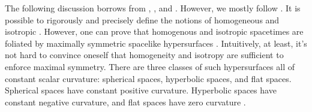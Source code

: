 \documentclass[]{article}
\begin{document}
% 

The following discussion borrows from \cite{Carroll},
\cite{MisnerThorneWheeler}, and \cite{Wald}. However, we mostly follow
\cite{Carroll}. It is possible to rigorously and precisely define the
notions of homogeneous and isotropic \cite{Wald}. However, one can
prove that homogenous and isotropic spacetimes are foliated by
maximally symmetric spacelike hypersurfaces
\cite{Carroll}. Intuitively, at least, it's not hard to convince
oneself that homogeneity and isotropy are sufficient to enforce
maximal symmetry. There are three classes of such hypersurfaces all of
constant scalar curvature: spherical spaces, hyperbolic spaces, and
flat spaces. Spherical spaces have constant positive
curvature. Hyperbolic spaces have constant negative curvature, and
flat spaces have zero curvature \cite{Carroll}.
\end{document}

